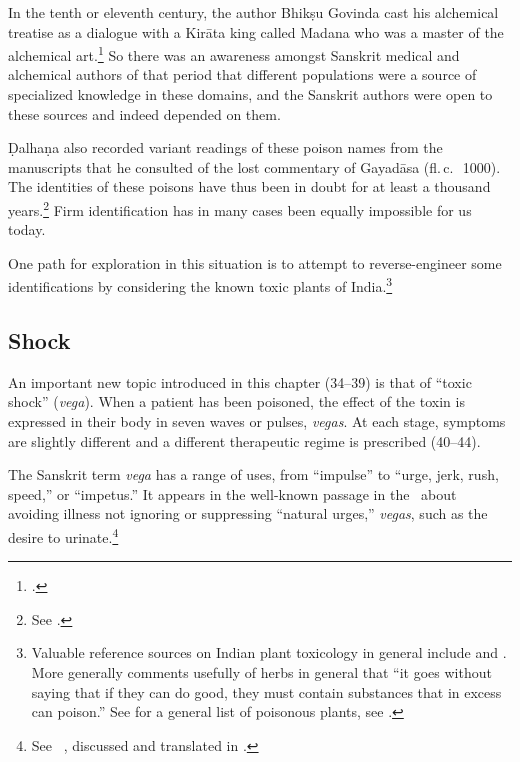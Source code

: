 In the tenth or eleventh century, the author Bhikṣu Govinda cast his
alchemical treatise as a dialogue with a Kirāta king called Madana who
was a master of the alchemical art.\footcite[IIA, 620]{meul-hist}  So
there was an awareness amongst Sanskrit medical and alchemical authors
of that period that different populations were a source of specialized
knowledge in these domains, and the Sanskrit authors were open to
these sources and indeed depended on them.

Ḍalhaṇa also recorded variant readings of these poison names from the
manuscripts that he consulted of the lost commentary of Gayadāsa
(fl.\,c.\,\AD\ 1000). The identities of these poisons have thus been
in doubt for at least a thousand years.\footnote{See
    \cite[80--81]{wuja-2003}.} Firm identification has in many cases been
    equally impossible for us today.

One path for exploration in this situation is to attempt to
reverse-engineer some identifications by considering the known toxic
plants of India.\footnote{Valuable reference sources on Indian plant
    toxicology in general include \cite[chs.\,10, 11]{pill-2013} and
    \cite[parts 1.II, 3 and 4]{barc-2008}. More generally \citet[41 et
    passim]{bown-2001} comments usefully of herbs in general that “it
    goes without saying that if they can do good, they must contain
    substances that in excess can poison.”  See for a general list of poisonous 
    plants, see \cite{wiki-2025a}.}

\subsection{Shock}

An important new topic introduced in this chapter (34--39) is that of “toxic
shock” (\emph{vega}).  When a patient has been 
poisoned, the effect of the toxin is expressed in their body in seven waves or 
pulses, \emph{vegas}.  At each stage, symptoms are slightly different and a 
different therapeutic regime is prescribed (40--44).  

The Sanskrit term \emph{vega} has a range of uses, from “impulse” to
“urge, jerk, rush, speed,” or “impetus.”  It appears in the
well-known passage in the \CS\ about avoiding illness not ignoring 
or suppressing “natural urges,” \emph{vegas}, such
as the desire to urinate.\footnote{See \CS\ , discussed and
    translated in \cite[7--8, 15--17]{wuja-2003}.}
    
